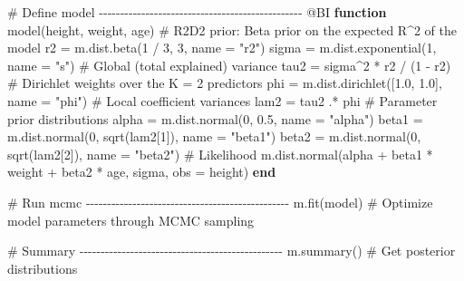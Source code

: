 \documentclass[
  letterpaper,
  DIV=11,
  numbers=noendperiod]{scrartcl}
\newenvironment{Shaded}{\begin{snugshade}}{\end{snugshade}}
\newcommand{\CommentTok}[1]{\textcolor[rgb]{0.37,0.37,0.37}{#1}}
\newcommand{\FloatTok}[1]{\textcolor[rgb]{0.68,0.00,0.00}{#1}}
\newcommand{\FunctionTok}[1]{\textcolor[rgb]{0.28,0.35,0.67}{#1}}
\newcommand{\KeywordTok}[1]{\textcolor[rgb]{0.00,0.23,0.31}{\textbf{#1}}}
\newcommand{\NormalTok}[1]{\textcolor[rgb]{0.00,0.23,0.31}{#1}}
\newcommand{\OperatorTok}[1]{\textcolor[rgb]{0.37,0.37,0.37}{#1}}
\newcommand{\PreprocessorTok}[1]{\textcolor[rgb]{0.68,0.00,0.00}{#1}}
\newcommand{\StringTok}[1]{\textcolor[rgb]{0.13,0.47,0.30}{#1}}
\begin{document}
\begin{Shaded}
\begin{Highlighting}[]
\CommentTok{\# Define model {-}{-}{-}{-}{-}{-}{-}{-}{-}{-}{-}{-}{-}{-}{-}{-}{-}{-}{-}{-}{-}{-}{-}{-}{-}{-}{-}{-}{-}{-}{-}{-}{-}{-}{-}{-}{-}{-}{-}{-}{-}{-}{-}{-}{-}{-}{-}{-}}
\PreprocessorTok{@BI} \KeywordTok{function} \FunctionTok{model}\NormalTok{(height, weight, age)}
    \CommentTok{\# R2D2 prior: Beta prior on the expected R\^{}2 of the model}
\NormalTok{    r2 }\OperatorTok{=}\NormalTok{ m.dist.}\FunctionTok{beta}\NormalTok{(}\FloatTok{1} \OperatorTok{/} \FloatTok{3}\NormalTok{, }\FloatTok{3}\NormalTok{, name }\OperatorTok{=} \StringTok{"r2"}\NormalTok{)}
\NormalTok{    sigma }\OperatorTok{=}\NormalTok{ m.dist.}\FunctionTok{exponential}\NormalTok{(}\FloatTok{1}\NormalTok{, name }\OperatorTok{=} \StringTok{"s"}\NormalTok{)}
    \CommentTok{\# Global (total explained) variance}
\NormalTok{    tau2 }\OperatorTok{=}\NormalTok{ sigma}\OperatorTok{\^{}}\FloatTok{2} \OperatorTok{*}\NormalTok{ r2 }\OperatorTok{/}\NormalTok{ (}\FloatTok{1} \OperatorTok{{-}}\NormalTok{ r2)}
    \CommentTok{\# Dirichlet weights over the K = 2 predictors}
\NormalTok{    phi }\OperatorTok{=}\NormalTok{ m.dist.}\FunctionTok{dirichlet}\NormalTok{([}\FloatTok{1.0}\NormalTok{, }\FloatTok{1.0}\NormalTok{], name }\OperatorTok{=} \StringTok{"phi"}\NormalTok{)}
    \CommentTok{\# Local coefficient variances}
\NormalTok{    lam2 }\OperatorTok{=}\NormalTok{ tau2 }\OperatorTok{.*}\NormalTok{ phi}
    \CommentTok{\# Parameter prior distributions}
\NormalTok{    alpha }\OperatorTok{=}\NormalTok{ m.dist.}\FunctionTok{normal}\NormalTok{(}\FloatTok{0}\NormalTok{, }\FloatTok{0.5}\NormalTok{, name }\OperatorTok{=} \StringTok{"alpha"}\NormalTok{)}
\NormalTok{    beta1 }\OperatorTok{=}\NormalTok{ m.dist.}\FunctionTok{normal}\NormalTok{(}\FloatTok{0}\NormalTok{, }\FunctionTok{sqrt}\NormalTok{(lam2[}\FloatTok{1}\NormalTok{]), name }\OperatorTok{=} \StringTok{"beta1"}\NormalTok{)}
\NormalTok{    beta2 }\OperatorTok{=}\NormalTok{ m.dist.}\FunctionTok{normal}\NormalTok{(}\FloatTok{0}\NormalTok{, }\FunctionTok{sqrt}\NormalTok{(lam2[}\FloatTok{2}\NormalTok{]), name }\OperatorTok{=} \StringTok{"beta2"}\NormalTok{)}
    \CommentTok{\# Likelihood}
\NormalTok{    m.dist.}\FunctionTok{normal}\NormalTok{(alpha }\OperatorTok{+}\NormalTok{ beta1 }\OperatorTok{*}\NormalTok{ weight }\OperatorTok{+}\NormalTok{ beta2 }\OperatorTok{*}\NormalTok{ age, sigma, obs }\OperatorTok{=}\NormalTok{ height)}
\KeywordTok{end}

\CommentTok{\# Run mcmc {-}{-}{-}{-}{-}{-}{-}{-}{-}{-}{-}{-}{-}{-}{-}{-}{-}{-}{-}{-}{-}{-}{-}{-}{-}{-}{-}{-}{-}{-}{-}{-}{-}{-}{-}{-}{-}{-}{-}{-}{-}{-}{-}{-}{-}{-}{-}{-}}
\NormalTok{m.}\FunctionTok{fit}\NormalTok{(model)  }\CommentTok{\# Optimize model parameters through MCMC sampling}

\CommentTok{\# Summary {-}{-}{-}{-}{-}{-}{-}{-}{-}{-}{-}{-}{-}{-}{-}{-}{-}{-}{-}{-}{-}{-}{-}{-}{-}{-}{-}{-}{-}{-}{-}{-}{-}{-}{-}{-}{-}{-}{-}{-}{-}{-}{-}{-}{-}{-}{-}{-}}
\NormalTok{m.}\FunctionTok{summary}\NormalTok{() }\CommentTok{\# Get posterior distributions}
\end{Highlighting}
\end{Shaded}
\end{document}
